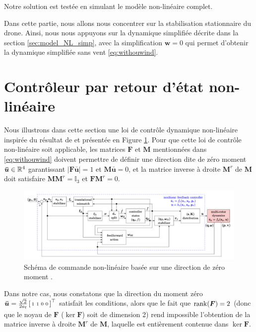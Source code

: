Notre solution est testée en simulant le modèle non-linéaire complet.

Dans cette partie, nous allons nous concentrer sur la stabilisation stationnaire du drone. Ainsi, nous nous appuyons sur la dynamique simplifiée décrite dans la section \ref{sec:model_NL_simp}, avec la simplification $\boldsymbol{w} = 0$ qui permet d'obtenir la dynamique simplifiée sans vent \eqref{eq:withouwind}. 



\section{Contrôleur par retour d'état non-linéaire}
Nous illustrons dans cette section une loi de contrôle dynamique non-linéaire inspirée du résultat de \cite{2020e-MicCenZacFra} et présentée en Figure \ref{fig:NLZeroMoment}. Pour que cette loi de contrôle non-linéaire soit applicable, les matrices $\boldsymbol{F}$ et $\boldsymbol{M}$ mentionnées dans \eqref{eq:withouwind} doivent permettre de définir une direction dite de zéro moment $\boldsymbol{\bar u} \in {\mathbb R}^4$ garantissant
$|\boldsymbol{F}\boldsymbol{\bar u}| = 1$ et $\boldsymbol{M} \boldsymbol{\bar u}=0$, et la matrice inverse à droite $\boldsymbol{M}^r$ de $\boldsymbol{M}$ doit satisfaire $\boldsymbol{M} \boldsymbol{M}^r = \mathbb{I}_3$ et $\boldsymbol{F}\boldsymbol{M}^r=0$. 

\begin{figure}[ht!]
  \centering
  \includegraphics[trim=0cm 0.6cm 0cm 0.6cm,clip,width=1\columnwidth]{figures/NLZeroMoment.png}
  \caption{Schéma de commande non-linéaire basée sur une direction de zéro moment \cite{2020e-MicCenZacFra}.}
  \label{fig:NLZeroMoment}
\end{figure}

Dans notre cas, nous constatons que la direction du moment zéro $\boldsymbol{\bar u} = \frac{\sqrt{2}}{2a_{\text{f}}}\left[ \begin{smallmatrix}1&1&0&0 \end{smallmatrix} \right]^\top$ satisfait les conditions, alors que le fait que $\operatorname{rank}(\boldsymbol{F}) = 2$ (donc que le noyau de $\boldsymbol{F}$ ($\ker \boldsymbol{F}$) soit de dimension 2) rend impossible l'obtention de la matrice inverse à droite $\boldsymbol{M}^r$ de $\boldsymbol{M}$, laquelle est entièrement contenue dans $\ker \boldsymbol{F}$.


